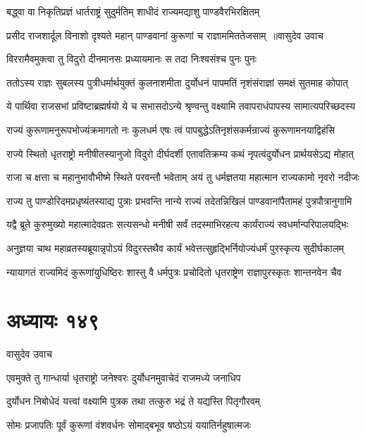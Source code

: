 \twolineshloka
{बद्ध्वा वा निकृतिप्रज्ञं धार्तराष्ट्रं सुदुर्मतिम्}
{शाधीदं राज्यमद्याशु पाण्डवैरभिरक्षितम्}


\threelineshloka
{प्रसीद राजशार्दूल विनाशो दृश्यते महान्}
{पाण्डवानां कुरूणां च राज्ञाममिततेजसाम् ॥वासुदेव उवाच}
{}


\twolineshloka
{विररामैवमुक्त्वा तु विदुरो दीनमानसः}
{प्रध्यायमानः स तदा निःश्वसंश्च पुनः पुनः}


\twolineshloka
{ततोऽस्य राज्ञः सुबलस्य पुत्रीधर्मार्थयुक्तं कुलनाशमीता}
{दुर्योधनं पापमतिं नृशंसंराज्ञां समक्षं सुतमाह कोपात्}


\twolineshloka
{ये पार्थिवा राजसभां प्रविष्टाब्रह्मर्षयो ये च सभासदोऽन्ये}
{श्रृण्वन्तु वक्ष्यामि तवापराधंपापस्य सामात्यपरिच्छदस्य}


\twolineshloka
{राज्यं कुरूणामनुरूपभोज्यंक्रमागतो नः कुलधर्म एषः}
{त्वं पापबुद्धेऽतिनृशंसकर्मन्राज्यं कुरूणामनयाद्विहंसि}


\twolineshloka
{राज्ये स्थितो धृतराष्ट्रो मनीषीतस्यानुजो विदुरो दीर्घदर्शी}
{एतावतिक्रम्य कथं नृपत्वंदुर्योधन प्रार्थयसेऽद्य मोहात्}


\twolineshloka
{राजा च क्षत्ता च महानुभावौभीष्मे स्थिते परवन्तौ भवेताम्}
{अयं तु धर्मज्ञतया महात्मान राज्यकामो नृवरो नदीजः}


\twolineshloka
{राज्य तु पाण्डोरिदमप्रधृष्यंतस्याद्य पुत्राः प्रभवन्ति नान्ये}
{राज्यं तदेतन्निखिलं पाण्डवानांपैतामहं पुत्रपौत्रानुगामि}


\twolineshloka
{यद्वै ब्रूते कुरुमुख्यो महात्मादेवव्रतः सत्यसन्धो मनीषी}
{सर्वं तदस्माभिरहत्य कार्यंराज्यं स्वधर्मान्परिपालयद्भिः}


\twolineshloka
{अनुज्ञया चाथ महाव्रतस्यब्रूयान्नृपोऽयं विदुरस्तथैव}
{कार्यं भवेत्तत्सुहृद्भिर्नियोज्यंधर्मं पुरस्कृत्य सुदीर्घकालम्}


\twolineshloka
{न्यायागतं राज्यमिदं कुरूणांयुधिष्ठिरः शास्तु वै धर्मपुत्रः}
{प्रचोदितो धृतराष्ट्रेण राज्ञापुरस्कृतः शान्तनवेन चैव}


\chapter{अध्यायः १४९}
\twolineshloka
{वासुदेव उवाच}
{}


\twolineshloka
{एवमुक्ते तु गान्धार्या धृतराष्ट्रो जनेश्वरः}
{दुर्योधनमुवाचेदं राजमध्ये जनाधिप}


\twolineshloka
{दुर्योधन निबोधेदं यत्त्वां वक्ष्यामि पुत्रक}
{तथा तत्कुरु भद्रं ते यद्यस्ति पितृगौरवम्}


\twolineshloka
{सोमः प्रजापतिः पूर्वं कुरूणां वंशवर्धनः}
{सोमाद्बभूव षष्ठोऽयं ययातिर्नहुषात्मजः}


